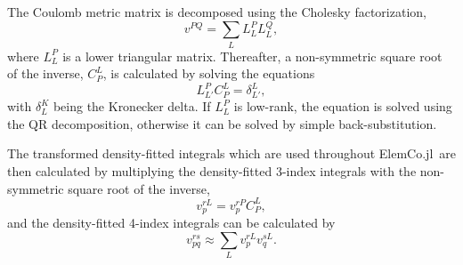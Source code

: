 \documentclass[a4paper,12pt,oneside]{book}
\newcommand{\elemcoil}{\textsf{ElemCo.jl}}
\begin{document}
The Coulomb metric matrix is decomposed using the Cholesky factorization,
\begin{equation}
  v^{PQ} = \sum_L L^{P}_{L} L^{Q}_{L},
\end{equation}
where $L^{P}_{L}$ is a lower triangular matrix.
Thereafter, a non-symmetric square root of the inverse, $C_P^L$, is 
calculated by solving the equations
\begin{equation}
  L^{P}_{L'} C_{P}^{L} = \delta^{L}_{L'},
\end{equation}
with $\delta^{K}_{L}$ being the Kronecker delta. 
If $L^{P}_{L}$ is low-rank, the equation is solved using the QR decomposition,
otherwise it can be solved by simple back-substitution.

The transformed density-fitted integrals which are used throughout \elemcoil\ are 
then calculated by multiplying the density-fitted 3-index 
integrals with the non-symmetric square root of the inverse,
\begin{equation}
  v_{p}^{rL} = v_{p}^{rP} C_P^L,
\end{equation}
and the density-fitted 4-index integrals can be calculated by
\begin{equation}
  v_{pq}^{rs} \approx \sum_L v_{p}^{rL} v_{q}^{sL}.
  \label{eq:df_eri}
\end{equation}
\end{document}
